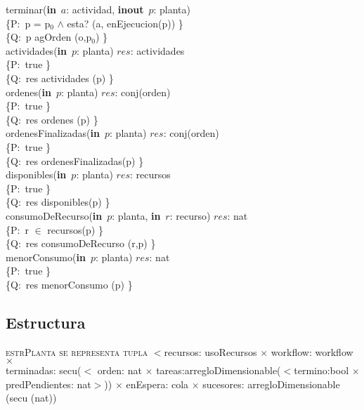 \documentclass[a4paper,10pt]{article}
\begin{document}
\noindent terminar(\textbf{in}\ $a$: actividad, \textbf{inout}\ $p$: planta)  \ \ \ \ \ \\
\indent \{P:\ p = p$_0$ $\wedge$ esta? (a, enEjecucion(p)) \}  \\
\indent \{Q:\ p \igobs agOrden (o,p$_0$) \}\\

\noindent actividades(\textbf{in}\ $p$: planta)  \en $res$: actividades \ \ \ \ \ \\
\indent \{P:\ true \}  \\
\indent \{Q:\ res \igobs actividades (p) \}\\

\noindent ordenes(\textbf{in}\ $p$: planta)  \en $res$: conj(orden) \ \ \ \ \ \\
\indent \{P:\ true \}  \\
\indent \{Q:\ res \igobs ordenes (p) \}\\

\noindent ordenesFinalizadas(\textbf{in}\ $p$: planta)  \en $res$: conj(orden) \ \ \ \ \ \\
\indent \{P:\ true \}  \\
\indent \{Q:\ res \igobs ordenesFinalizadas(p) \}\\

\noindent disponibles(\textbf{in}\ $p$: planta)  \en $res$: recursos \ \ \ \ \ \\
\indent \{P:\ true \}  \\
\indent \{Q:\ res \igobs disponibles(p) \}\\

\noindent consumoDeRecurso(\textbf{in}\ $p$: planta, \textbf{in}\ $r$: recurso)  \en $res$: nat \ \ \ \ \ \\
\indent \{P:\ r $\in$ recursos(p) \}  \\
\indent \{Q:\ res \igobs consumoDeRecurso (r,p) \}\\

\noindent menorConsumo(\textbf{in}\ $p$: planta)  \en $res$: nat \ \ \ \ \ \\
\indent \{P:\ true \}  \\
\indent \{Q:\ res \igobs menorConsumo (p) \}\\
\newpage
\subsection{Estructura}

    \noindent \textsc{estrPlanta se representa tupla} $<$recursos: usoRecursos $\times$ workflow: workflow $\times$ \\ terminadas: secu($<$ orden: nat $\times$ tareas:arregloDimensionable($<$termino:bool $\times$ predPendientes: nat$>$)) $\times$ enEspera: cola $\times$ sucesores: arregloDimensionable (secu (nat))\\ 
\end{document}
